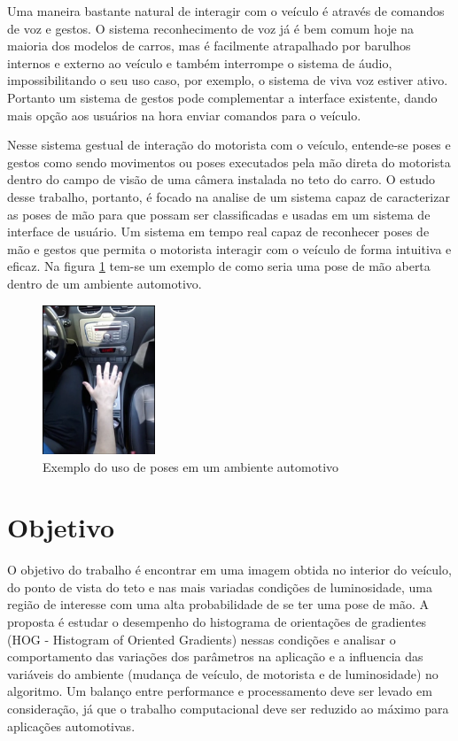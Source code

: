 Uma maneira bastante natural de interagir com o veículo é através de comandos de voz e gestos. O sistema reconhecimento de voz já é bem comum hoje na maioria dos modelos de carros, mas é facilmente atrapalhado por barulhos internos e externo ao veículo e também interrompe o sistema de áudio, impossibilitando o seu uso caso, por exemplo, o sistema de viva voz estiver ativo. Portanto um sistema de gestos pode complementar a interface existente, dando mais opção aos usuários na hora enviar comandos para o veículo.

Nesse sistema gestual de interação do motorista com o veículo, entende-se poses e gestos como sendo movimentos ou poses executados pela mão direta do motorista dentro do campo de visão de uma câmera instalada no teto do carro.
O estudo desse trabalho, portanto, é focado na analise de um sistema capaz de caracterizar as poses de mão para que possam ser classificadas e usadas em um sistema de interface de usuário. Um sistema em tempo real capaz de reconhecer poses de mão e gestos que permita o motorista interagir com o veículo de forma intuitiva e eficaz. Na figura \ref{fig:visao_aplicacao} tem-se um exemplo de como seria uma pose de mão aberta dentro de um ambiente automotivo.

\begin{figure}[ht!]
	\centering
	\includegraphics[width=0.3\textwidth]{image/exemplo_visao_aplicacao.png}
	\caption{Exemplo do uso de poses em um ambiente automotivo}
	\label{fig:visao_aplicacao}
\end{figure}

\section{Objetivo}

O objetivo do trabalho é encontrar em uma imagem obtida no interior do veículo, do ponto de vista do teto e nas mais variadas condições de luminosidade, uma região de interesse com uma alta probabilidade de se ter uma pose de mão. A proposta é estudar o desempenho do histograma de orientações de gradientes (HOG - Histogram of Oriented Gradients) nessas condições e analisar o comportamento das variações dos parâmetros na aplicação e a influencia das variáveis do ambiente (mudança de veículo, de motorista e de luminosidade) no algoritmo.
Um balanço entre performance e processamento deve ser levado em consideração, já que o trabalho computacional deve ser reduzido ao máximo para aplicações automotivas.


